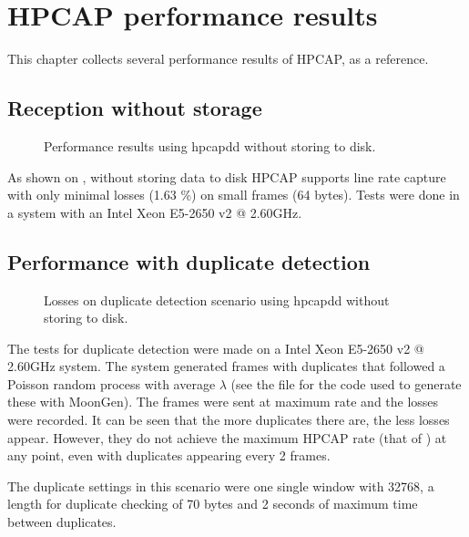 \chapter{HPCAP performance results}

This chapter collects several performance results of HPCAP, as a reference.

\section{Reception without storage}

\begin{figure}[hbtp]
\centering
{}
\caption{Performance results using hpcapdd without storing to disk.}
\label{fig:hpcapdd-nostorage}
\end{figure}

As shown on , without storing data to disk HPCAP supports line rate capture with only minimal losses (1.63 \%) on small frames (64 bytes). Tests were done in a system with an Intel Xeon E5-2650 v2 @ 2.60GHz.

\section{Performance with duplicate detection}

\begin{figure}[hbtp]
\centering
{}
\caption{Losses on duplicate detection scenario using hpcapdd without storing to disk.}
\label{fig:duplicate-rates}
\end{figure}

The tests for duplicate detection were made on a Intel Xeon E5-2650 v2 @ 2.60GHz system. The system generated frames with duplicates that followed a Poisson random process with average $\lambda$ (see the file  for the code used to generate these with MoonGen). The frames were sent at maximum rate and the losses were recorded. It can be seen that the more duplicates there are, the less losses appear. However, they do not achieve the maximum HPCAP rate (that of ) at any point, even with duplicates appearing every 2 frames.

The duplicate settings in this scenario were one single window with 32768, a length for duplicate checking of 70 bytes and 2 seconds of maximum time between duplicates.
